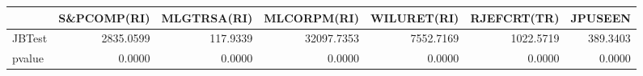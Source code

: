 \begin{tabular}{lrrrrrr}
\toprule
{} &  S\&PCOMP(RI) &  MLGTRSA(RI) &  MLCORPM(RI) &  WILURET(RI) &  RJEFCRT(TR) &   JPUSEEN \\
\midrule
JBTest &    2835.0599 &     117.9339 &   32097.7353 &    7552.7169 &    1022.5719 &  389.3403 \\
pvalue &       0.0000 &       0.0000 &       0.0000 &       0.0000 &       0.0000 &    0.0000 \\
\bottomrule
\end{tabular}
